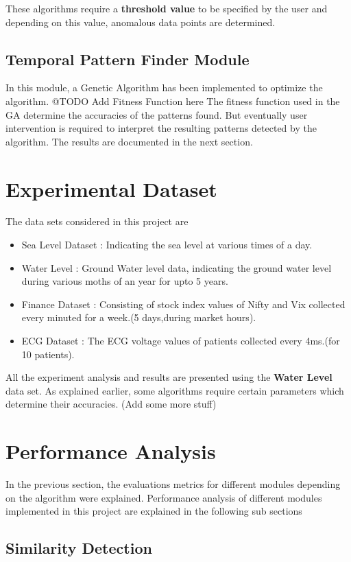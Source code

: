 \documentclass[12pt]{report}
\begin{document}
These algorithms require a \textbf{threshold value} to be specified by the user and depending on this value, anomalous data points are determined.
\subsection{Temporal Pattern Finder Module}
In this module, a Genetic Algorithm has been implemented to optimize the algorithm.
@TODO Add Fitness Function here
The fitness function used in the GA determine the accuracies of the patterns found. But eventually user intervention is required to interpret the resulting patterns detected by the algorithm. The results are documented in the next section.
\section{Experimental Dataset}
The data sets considered in this project are
\begin{itemize}
\item Sea Level Dataset : Indicating the sea level at various times of a day.
\item Water Level : Ground Water level data, indicating the ground water level during various moths of an year for upto 5 years.
\item Finance Dataset : Consisting of stock index values of  Nifty and Vix collected every minuted for a week.(5 days,during market hours).
\item ECG Dataset : The ECG  voltage values of patients collected every 4ms.(for 10 patients).
\end{itemize}
All the experiment analysis and results are presented using the \textbf{Water Level} data set. As explained earlier, some algorithms require certain parameters which determine their accuracies. (Add some more stuff)
\section{Performance Analysis}
In the previous section, the evaluations metrics for different modules depending on the algorithm were explained. Performance analysis of different modules implemented in this project are explained in the following sub sections
\subsection{Similarity Detection}
\end{document}
